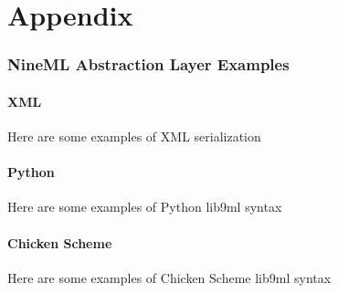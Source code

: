 \documentclass[a4paper]{article}
\begin{document}
\newpage


\appendix


\part*{Appendix}

\section{\label{ap_examples}NineML Abstraction Layer Examples}

\subsection{XML}

Here are some examples of XML serialization


\subsection{Python}

Here are some examples of Python lib9ml syntax


\subsection{Chicken Scheme}

Here are some examples of Chicken Scheme lib9ml syntax



\end{document}
